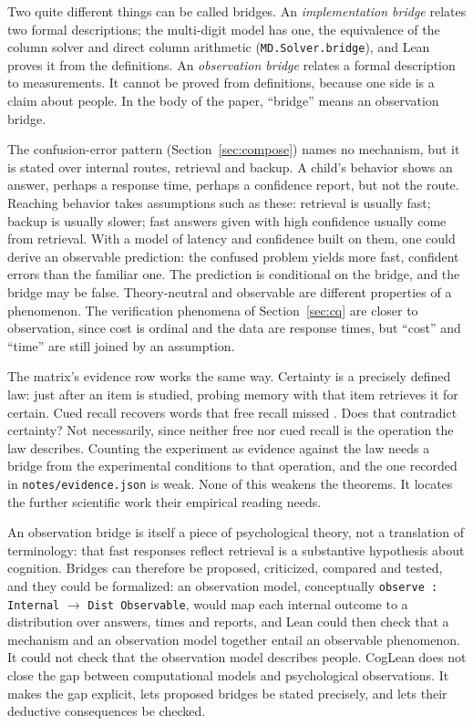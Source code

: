 \documentclass[11pt]{article}
\newcommand{\code}[1]{\texttt{#1}}
\newcommand{\lean}[1]{\texttt{#1}}
\begin{document}
Two quite different things can be called bridges. An \emph{implementation bridge} relates two formal descriptions; the multi-digit model has one, the equivalence of the column solver and direct column arithmetic (\lean{MD.Solver.bridge}), and Lean proves it from the definitions. An \emph{observation bridge} relates a formal description to measurements. It cannot be proved from definitions, because one side is a claim about people. In the body of the paper, ``bridge'' means an observation bridge.

The confusion-error pattern (Section~\ref{sec:compose}) names no mechanism, but it is stated over internal routes, retrieval and backup. A child's behavior shows an answer, perhaps a response time, perhaps a confidence report, but not the route. Reaching behavior takes assumptions such as these: retrieval is usually fast; backup is usually slower; fast answers given with high confidence usually come from retrieval. With a model of latency and confidence built on them, one could derive an observable prediction: the confused problem yields more fast, confident errors than the familiar one. The prediction is conditional on the bridge, and the bridge may be false. Theory-neutral and observable are different properties of a phenomenon. The verification phenomena of Section~\ref{sec:cq} are closer to observation, since cost is ordinal and the data are response times, but ``cost'' and ``time'' are still joined by an assumption.

The matrix's evidence row works the same way. Certainty is a precisely defined law: just after an item is studied, probing memory with that item retrieves it for certain. Cued recall recovers words that free recall missed \citep{tulving1966}. Does that contradict certainty? Not necessarily, since neither free nor cued recall is the operation the law describes. Counting the experiment as evidence against the law needs a bridge from the experimental conditions to that operation, and the one recorded in \code{notes/evidence.json} is weak. None of this weakens the theorems. It locates the further scientific work their empirical reading needs.

An observation bridge is itself a piece of psychological theory, not a translation of terminology: that fast responses reflect retrieval is a substantive hypothesis about cognition. Bridges can therefore be proposed, criticized, compared and tested, and they could be formalized: an observation model, conceptually \code{observe : Internal} $\to$ \code{Dist Observable}, would map each internal outcome to a distribution over answers, times and reports, and Lean could then check that a mechanism and an observation model together entail an observable phenomenon. It could not check that the observation model describes people. CogLean does not close the gap between computational models and psychological observations. It makes the gap explicit, lets proposed bridges be stated precisely, and lets their deductive consequences be checked.
\end{document}
